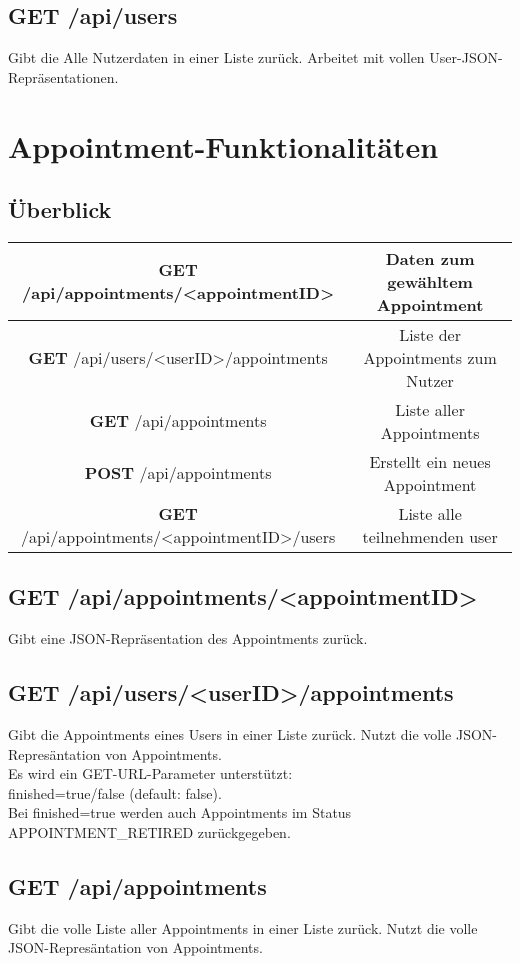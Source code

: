 \documentclass[11pt,a4paper]{article}
\begin{document}
\subsection{\textbf{GET} /api/users}
Gibt die Alle Nutzerdaten in einer Liste zurück. Arbeitet mit vollen User-JSON-Repräsentationen.
\section{Appointment-Funktionalitäten}
\subsection{Überblick}
\begin{tabular}{|c|c|}
\hline
\textbf{GET} /api/appointments/<appointmentID> & Daten zum gewähltem Appointment \\
\hline
\textbf{GET} /api/users/<userID>/appointments & Liste der Appointments zum Nutzer \\
\hline
\textbf{GET} /api/appointments & Liste aller Appointments \\
\hline
\textbf{POST} /api/appointments & Erstellt ein neues Appointment \\
\hline
\textbf{GET} /api/appointments/<appointmentID>/users & Liste alle teilnehmenden user \\
\hline
\end{tabular}

\subsection{\textbf{GET} /api/appointments/<appointmentID>}
Gibt eine JSON-Repräsentation des Appointments zurück.
\subsection{\textbf{GET} /api/users/<userID>/appointments}
Gibt die Appointments eines Users in einer Liste zurück. Nutzt die volle JSON-Represäntation von Appointments. \\
Es wird ein GET-URL-Parameter unterstützt: \\
finished=true/false (default: false). \\
Bei finished=true werden auch Appointments im Status APPOINTMENT\_RETIRED zurückgegeben.
\subsection{\textbf{GET} /api/appointments}
Gibt die volle Liste aller Appointments in einer Liste zurück. Nutzt die volle JSON-Represäntation von Appointments.
\end{document}
